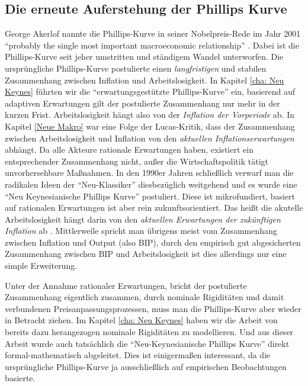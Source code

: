 \subsection{Die erneute Auferstehung der Phillips Kurve}
\label{NeuePhillips}
George Akerlof nannte die Phillips-Kurve in seiner Nobelpreis-Rede im Jahr 2001 "`probably the single most important macroeconomic relationship"' \parencite{Nobelpreis-Komitee2001}. Dabei ist die Phillips-Kurve seit jeher umstritten und ständigem Wandel unterworfen. Die ursprüngliche Phillips-Kurve postulierte einen \textit{langfristigen} und stabilen Zusammenhang zwischen Inflation und Arbeitslosigkeit. In Kapitel \ref{cha: Neu Keynes} führten wir die "`erwartungsgestützte Phillips-Kurve"' ein, basierend auf adaptiven Erwartungen gilt der postulierte Zusammenhang nur mehr in der kurzen Frist. Arbeitslosigkeit hängt also von der \textit{Inflation der Vorperiode} ab. In Kapitel \ref{Neue Makro} war eine Folge der Lucas-Kritik, dass der Zusammenhang zwischen Arbeitslosigkeit und Inflation von den \textit{aktuellen Inflationserwartungen} abhängt. Da alle Akteure rationale Erwartungen haben, existiert ein entsprechender Zusammenhang nicht, außer die Wirtschaftspolitik tätigt unvorhersehbare Maßnahmen. In den 1990er Jahren schließlich verwarf man die radikalen Ideen der "`Neu-Klassiker"' diesbezüglich weitgehend und es wurde eine "`Neu Keynesianische Phillips Kurve"' postuliert. Diese ist mikrofundiert, basiert auf rationalen Erwartungen ist aber rein zukunftsorientiert. Das heißt die akutelle Arbeitslosigkeit hängt darin von den \textit{aktuellen Erwartungen der zukünftigen Inflation} ab \parencite[S. 980]{Roberts1995}. Mittlerweile spricht man übrigens meist vom Zusammenhang zwischen Inflation und Output (also BIP), durch den empirisch gut abgesicherten Zusammenhang zwischen BIP und Arbeitslosigkeit ist dies allerdings nur eine simple Erweiterung.

Unter der Annahme rationaler Erwartungen, bricht der postulierte Zusammenhang eigentlich zusammen, durch nominale Rigiditäten und damit verbundenen Preisanpassungsprozessen, muss man die Phillips-Kurve aber wieder in Betracht ziehen. Im Kapitel \ref{cha: Neu Keynes} haben wir die Arbeit von \textcite{Calvo1983} bereits dazu herangezogen nominale Rigiditäten zu modellieren. Und aus dieser Arbeit wurde auch tatsächlich die "`Neu-Keynesianische Phillips Kurve"' direkt formal-mathematisch abgeleitet. Dies ist einigermaßen interessant, da die ursprüngliche Phillips-Kurve ja ausschließlich auf empirischen Beobachtungen basierte.

